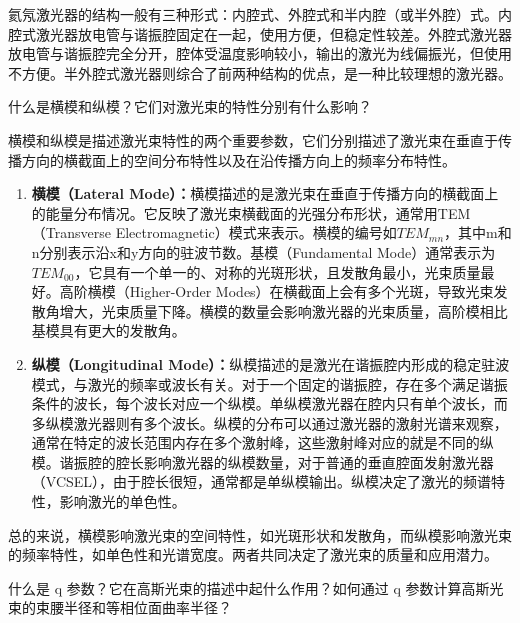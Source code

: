 \documentclass[dvipsnames, svgnames,a4paper,11pt]{article}
\begin{document}
	氦氖激光器的结构一般有三种形式：内腔式、外腔式和半内腔（或半外腔）式。内腔式激光器放电管与谐振腔固定在一起，使用方便，但稳定性较差。外腔式激光器放电管与谐振腔完全分开，腔体受温度影响较小，输出的激光为线偏振光，但使用不方便。半外腔式激光器则综合了前两种结构的优点，是一种比较理想的激光器。

	




\begin{question}
	什么是横模和纵模？它们对激光束的特性分别有什么影响？
\end{question}

	横模和纵模是描述激光束特性的两个重要参数，它们分别描述了激光束在垂直于传播方向的横截面上的空间分布特性以及在沿传播方向上的频率分布特性。

	\begin{enumerate}
		\item \textbf{横模（Lateral Mode）：}横模描述的是激光束在垂直于传播方向的横截面上的能量分布情况。它反映了激光束横截面的光强分布形状，通常用TEM（Transverse Electromagnetic）模式来表示。横模的编号如$TEM_{mn}$，其中m和n分别表示沿x和y方向的驻波节数。基模（Fundamental Mode）通常表示为$TEM_{00}$，它具有一个单一的、对称的光斑形状，且发散角最小，光束质量最好。高阶横模（Higher-Order Modes）在横截面上会有多个光斑，导致光束发散角增大，光束质量下降。横模的数量会影响激光器的光束质量，高阶模相比基模具有更大的发散角。
		
		\item \textbf{纵模（Longitudinal Mode）：}纵模描述的是激光在谐振腔内形成的稳定驻波模式，与激光的频率或波长有关。对于一个固定的谐振腔，存在多个满足谐振条件的波长，每个波长对应一个纵模。单纵模激光器在腔内只有单个波长，而多纵模激光器则有多个波长。纵模的分布可以通过激光器的激射光谱来观察，通常在特定的波长范围内存在多个激射峰，这些激射峰对应的就是不同的纵模。谐振腔的腔长影响激光器的纵模数量，对于普通的垂直腔面发射激光器（VCSEL），由于腔长很短，通常都是单纵模输出。纵模决定了激光的频谱特性，影响激光的单色性。
	\end{enumerate}
	
	总的来说，横模影响激光束的空间特性，如光斑形状和发散角，而纵模影响激光束的频率特性，如单色性和光谱宽度。两者共同决定了激光束的质量和应用潜力。
	





\begin{question}
	什么是 q 参数？它在高斯光束的描述中起什么作用？如何通过 q 参数计算高斯光束的束腰半径和等相位面曲率半径？
\end{question}
\end{document}
